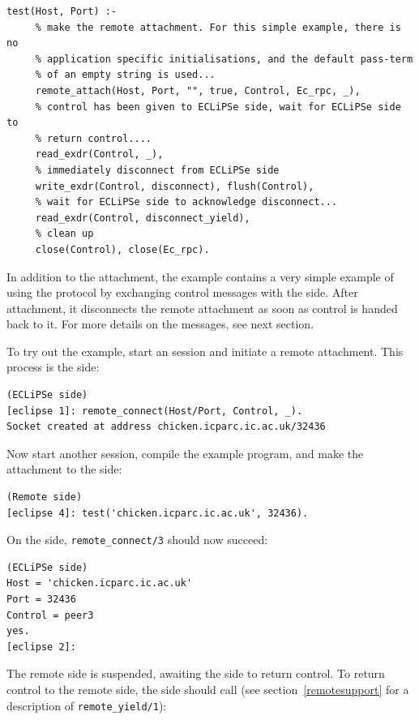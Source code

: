 \begin{verbatim}
test(Host, Port) :-
     % make the remote attachment. For this simple example, there is no
     % application specific initialisations, and the default pass-term
     % of an empty string is used...
     remote_attach(Host, Port, "", true, Control, Ec_rpc, _),
     % control has been given to ECLiPSe side, wait for ECLiPSe side to
     % return control....
     read_exdr(Control, _),
     % immediately disconnect from ECLiPSe side
     write_exdr(Control, disconnect), flush(Control),
     % wait for ECLiPSe side to acknowledge disconnect...
     read_exdr(Control, disconnect_yield),
     % clean up
     close(Control), close(Ec_rpc).

\end{verbatim}

In addition to the attachment, the example contains a very simple example
of using the protocol by exchanging control messages with the {\eclipse}
side. After attachment, it disconnects the remote attachment as soon as
control is handed back to it. For more details on the messages, see next
section. 

To try out the example, start an {\eclipse} session and initiate a remote
attachment. This process is the {\eclipse} side:

\begin{verbatim}
(ECLiPSe side)
[eclipse 1]: remote_connect(Host/Port, Control, _).
Socket created at address chicken.icparc.ic.ac.uk/32436
\end{verbatim}

Now start another {\eclipse} session, compile the example program, and make
the attachment to the {\eclipse} side:

\begin{verbatim}
(Remote side)
[eclipse 4]: test('chicken.icparc.ic.ac.uk', 32436).
\end{verbatim}

On the {\eclipse} side, {\tt remote_connect/3} should now succeed:

\begin{verbatim}
(ECLiPSe side)
Host = 'chicken.icparc.ic.ac.uk'
Port = 32436
Control = peer3
yes.
[eclipse 2]: 
\end{verbatim}

The remote side is suspended, awaiting the {\eclipse} side to return
control. To return control to the remote side, the {\eclipse} side should
call  (see section~\ref{remotesupport} for a description
of {\tt remote_yield/1}):

